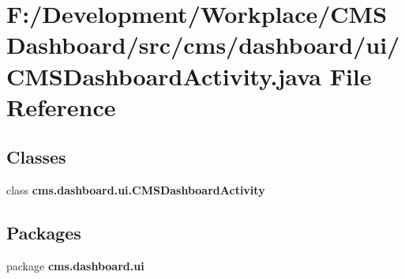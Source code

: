 \section{\-F\-:/\-Development/\-Workplace/\-C\-M\-S \-Dashboard/src/cms/dashboard/ui/\-C\-M\-S\-Dashboard\-Activity.java \-File \-Reference}
\label{_c_m_s_dashboard_activity_8java}
\subsection*{\-Classes}
\begin{DoxyCompactItemize}
\item 
class {\bf cms.\-dashboard.\-ui.\-C\-M\-S\-Dashboard\-Activity}
\end{DoxyCompactItemize}
\subsection*{\-Packages}
\begin{DoxyCompactItemize}
\item 
package {\bf cms.\-dashboard.\-ui}
\end{DoxyCompactItemize}
